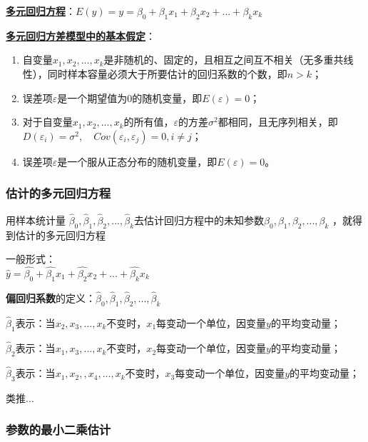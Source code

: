 \documentclass[UTF8,10pt]{book}
\begin{document}
{\textbf{\underline{多元回归方程}}：\( E(y) = y = \beta_0 + \beta_1 x_1 + \beta_2 x_2 + ... + \beta_k x_k \)

\textbf{\underline{多元回归方差模型中的基本假定}}：

\begin{enumerate}
	\def\labelenumi{\arabic{enumi}.}
	\item
	自变量\(x_1,x_2,...,x_k\)是非随机的、固定的，且相互之间互不相关（无多重共线性），同时样本容量必须大于所要估计的回归系数的个数，即\(n>k\)；
	\item
	误差项\(\varepsilon\)是一个期望值为\(0\)的随机变量，即\(E(\varepsilon)=0\)；
	\item
	对于自变量\(x_1,x_2,...,x_k\)的所有值，\(\varepsilon\)的方差\(\sigma^2\)都相同，且无序列相关，即\(D(\varepsilon_i) = \sigma^2 ,\quad Cov(\varepsilon_i,\varepsilon_j)=0,i \neq j\)；
	\item
	误差项\(\varepsilon\)是一个服从正态分布的随机变量，即\(E(\varepsilon)=0\)。
\end{enumerate}

\subsubsection{估计的多元回归方程}\label{header-n159}

用样本统计量
\( \hat{\beta}_0,\hat{\beta}_1,\hat{\beta}_2,...,\hat{\beta}_k \)去估计回归方程中的未知参数\( \beta_0,\beta_1,\beta_2,...,\beta_k\)
，就得到估计的多元回归方程

一般形式：\\
\( \hat{y} = \hat{\beta_0} + \hat{\beta_1} x_1 + \hat{\beta_2} x_2 + ... + \hat{\beta_k} x_k \)

\textbf{偏回归系数}的定义：\( \hat{\beta}_0,\hat{\beta}_1,\hat{\beta}_2,...,\hat{\beta}_k \)

\(\hat{\beta}_1\)表示：当\( x_2,x_3,...,x_k\)不变时，\(x_1\)每变动一个单位，因变量\(y\)的平均变动量；

\(\hat{\beta}_2\)表示：当\( x_1,x_3,...,x_k\)不变时，\(x_2\)每变动一个单位，因变量\(y\)的平均变动量；

\(\hat{\beta}_3\)表示：当\( x_1,x_2,,x_4,...,x_k\)不变时，\(x_3\)每变动一个单位，因变量\(y\)的平均变动量；

类推...

\subsubsection{参数的最小二乘估计}\label{header-n167}

}
\end{document}
